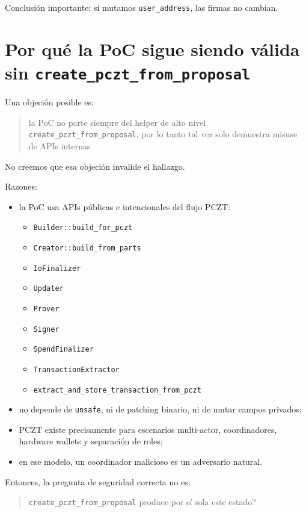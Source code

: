 \documentclass[11pt,a4paper]{article}
\begin{document}
Conclusión importante: si mutamos \texttt{user\_address}, las firmas no cambian.

\section{Por qu\'e la PoC sigue siendo v\'alida sin \texttt{create\_pczt\_from\_proposal}}

Una objeci\'on posible es:

\begin{quote}
la PoC no parte siempre del helper de alto nivel
\texttt{create\_pczt\_from\_proposal}, por lo tanto tal vez solo demuestra
misuse de APIs internas
\end{quote}

No creemos que esa objeci\'on invalide el hallazgo.

Razones:

\begin{itemize}[leftmargin=2em]
    \item la PoC usa APIs p\'ublicas e intencionales del flujo PCZT:
    \begin{itemize}
        \item \texttt{Builder::build\_for\_pczt}
        \item \texttt{Creator::build\_from\_parts}
        \item \texttt{IoFinalizer}
        \item \texttt{Updater}
        \item \texttt{Prover}
        \item \texttt{Signer}
        \item \texttt{SpendFinalizer}
        \item \texttt{TransactionExtractor}
        \item \texttt{extract\_and\_store\_transaction\_from\_pczt}
    \end{itemize}
    \item no depende de \texttt{unsafe}, ni de patching binario, ni de mutar
    campos privados;
    \item PCZT existe precisamente para escenarios multi-actor, coordinadores,
    hardware wallets y separaci\'on de roles;
    \item en ese modelo, un coordinador malicioso es un adversario natural.
\end{itemize}

Entonces, la pregunta de seguridad correcta no es:

\begin{quote}
\texttt{create\_pczt\_from\_proposal} produce por s\'i sola este estado?
\end{quote}
\end{document}
